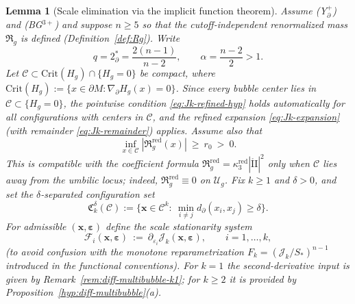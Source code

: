 \documentclass[11pt,reqno,a4paper]{amsart}
\numberwithin{equation}{section}
\theoremstyle{plain}
\newtheorem{lemma}[theorem]{Lemma}
\theoremstyle{remark}
\theoremstyle{plain}
\begin{document}
\begin{lemma}[Scale elimination via the implicit function theorem]\label{lem:scale-elim}
Assume \textup{(Y$^+_{\partial}$)} and \textup{(BG$^{3+}$)} and suppose $n\ge5$ so that the cutoff-independent
renormalized mass $\mathfrak R_g$ is defined (Definition~\ref{def:Rg}). Write
\[
q=2^*_{\partial}=\frac{2(n-1)}{n-2},\qquad \alpha=\frac{n-2}{2}>1.
\]
Let $\mathcal C\subset\mathrm{Crit}(H_g)\cap\{H_g=0\}$ be compact,
where $\mathrm{Crit}(H_g):=\{x\in\partial M:\nabla_\partial H_g(x)=0\}$.
Since every bubble center lies in $\mathcal C\subset\{H_g=0\}$, the pointwise condition
\eqref{eq:Jk-refined-hyp} holds automatically for all configurations with centers in $\mathcal C$,
and the refined expansion \eqref{eq:Jk-expansion} (with remainder \eqref{eq:Jk-remainder})
applies. Assume also that
\[
\inf_{x\in\mathcal C}|\mathfrak R_g^{\mathrm{red}}(x)|\ \ge\ r_0\ >\ 0.
\]
This is compatible with the coefficient formula
$\mathfrak R_g^{\mathrm{red}}=\kappa_3^{\mathrm{red}}|\mathring{\mathrm{II}}|^2$
only when $\mathcal C$ lies away from the umbilic locus;
indeed, $\mathfrak R_g^{\mathrm{red}}\equiv0$ on $\mathcal U_g$.
Fix $k\ge1$ and $\delta>0$, and set the $\delta$-separated configuration set
\[
\mathfrak C_k^\delta(\mathcal C)
:=\Big\{\mathbf x\in\mathcal C^k:\ \min_{i\neq j}d_\partial(x_i,x_j)\ge\delta\Big\}.
\]
For admissible $(\mathbf x,\boldsymbol\varepsilon)$ define the \emph{scale stationarity system}
\[
\mathcal F_i(\mathbf x,\boldsymbol\varepsilon)\ :=\ \partial_{\varepsilon_i}\mathcal J_k(\mathbf x,\boldsymbol\varepsilon),
\qquad i=1,\dots,k,
\]
(to avoid confusion with the monotone reparametrization $F_k=(\mathcal J_k/S_\ast)^{n-1}$ introduced in the
functional conventions).
For $k=1$ the second-derivative input is given by Remark~\ref{rem:diff-multibubble-k1};
for $k\ge2$ it is provided by Proposition~\ref{hyp:diff-multibubble}\textup{(a)}.


\end{lemma}
\end{document}
